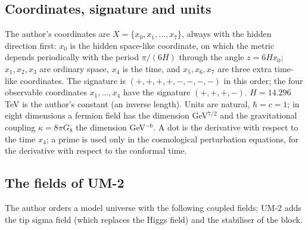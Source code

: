 \documentclass[
  10pt,
]{article}
\begin{document}
\hypertarget{coordinates-signature-and-units}{%
\subsection{Coordinates, signature and
units}\label{coordinates-signature-and-units}}

The author's coordinates are \(X = \{x_0, x_1, \dots, x_7\}\), always
with the hidden direction first: \(x_0\) is the hidden space-like
coordinate, on which the metric depends periodically with the period
\(\pi/(6H)\) through the angle \(z = 6Hx_0\); \(x_1, x_2, x_3\) are
ordinary space, \(x_4\) is the time, and \(x_5, x_6, x_7\) are three
extra time-like coordinates. The signature is \((+,+,+,+,-,-,-,-)\) in
this order; the four observable coordinates \(x_1, \dots, x_4\) have the
signature \((+,+,+,-)\). \(H = 14.296\) TeV is the author's constant (an
inverse length). Units are natural, \(\hbar = c = 1\); in eight
dimensions a fermion field has the dimension GeV\(^{7/2}\) and the
gravitational coupling \(\kappa = 8\pi G_8\) the dimension GeV\(^{-6}\).
A dot is the derivative with respect to the time \(x_4\); a prime is
used only in the cosmological perturbation equations, for the derivative
with respect to the conformal time.

\hypertarget{the-fields-of-um-2}{%
\subsection{The fields of UM-2}\label{the-fields-of-um-2}}

The author orders a model universe with the following coupled fields;
UM-2 adds the tip sigma field (which replaces the Higgs field) and the
stabiliser of the block.
\end{document}
